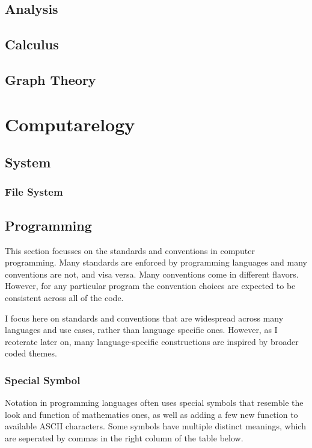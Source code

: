 \documentclass{article}
\begin{document}
\subsection{Analysis}

\subsection{Calculus}

\subsection{Graph Theory}

\section{Computarelogy}

\subsection{System}

\subsubsection{File System}
\subsubsection{}

\subsection{Programming}

	This section focusses on the standards and conventions in computer programming. Many standards are enforced by programming languages and many conventions are not, and visa versa. Many conventions come in different flavors. However, for any particular program the convention choices are expected to be consistent across all of the code.

	I focus here on standards and conventions that are widespread across many languages and use cases, rather than language specific ones. However, as I reoterate later on, many language-specific constructions are inspired by broader coded themes.

\subsubsection{Special Symbol}
	Notation in programming languages often uses special symbols that resemble the look and function of mathematics ones, as well as adding a few new function to available ASCII characters. Some symbols have multiple distinct meanings, which are seperated by commas in the right column of the table below.
\end{document}

